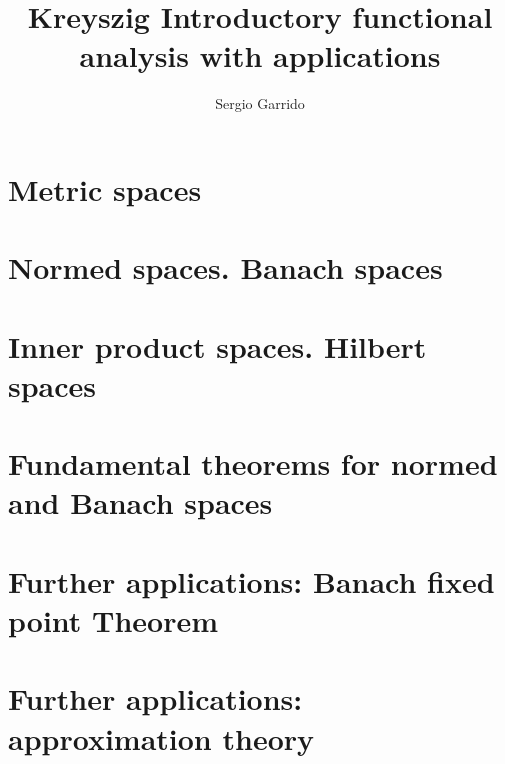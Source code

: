 \documentclass{bookSolutions}
\title{Kreyszig  Introductory functional analysis with applications}
\author{Sergio Garrido}
\begin{document}
\maketitle

\tableofcontents

\chapter{Metric spaces}







\chapter{Normed spaces. Banach spaces}











\chapter{Inner product spaces. Hilbert spaces}











\chapter{Fundamental theorems for normed and Banach spaces}














\chapter{Further applications: Banach fixed point Theorem}


\chapter{Further applications: approximation theory}

\end{document}
